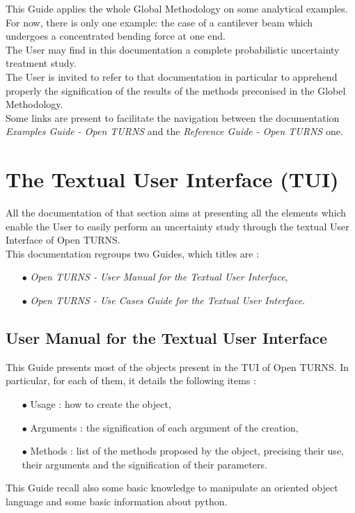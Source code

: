 \documentclass[11pt]{article}
\begin{document}
This Guide applies the whole Global Methodology on some analytical examples. For now, there is only one example: the case of a cantilever beam which undergoes a concentrated bending force at one end.\\

The User may find in this documentation a complete probabilistic uncertainty treatment study.\\

The User is invited to refer to that documentation in particular to apprehend properly the signification of the results of the methods preconised in the Globel Methodology.\\

Some links are present to facilitate the navigation between the documentation {\itshape Examples Guide - Open TURNS} and the {\itshape Reference Guide - Open TURNS} one.


\section{The Textual User Interface (TUI)}

All the documentation of that section aims at presenting all the elements which enable the User to easily perform an uncertainty study through the textual User Interface of Open TURNS. \\

This documentation regroups two Guides, which titles are :
\begin{itemize}
\item[$\bullet$] {\itshape Open TURNS - User Manual for the Textual User Interface},
\item[$\bullet$] {\itshape Open TURNS - Use Cases Guide for the Textual User Interface}.
\end{itemize}


\subsection{ User Manual for the Textual User Interface}

This Guide presents most of the objects present in the TUI of Open TURNS. In particular, for each of them, it details  the following items :
\begin{itemize}
\item[$\bullet$] Usage : how to create the object,
\item[$\bullet$] Arguments : the signification of each argument of the creation,
\item[$\bullet$] Methods : list of the methods proposed by the object, precising their use, their arguments and the signification of their parameters.
\end{itemize}
\vspace{0.5cm}
This Guide recall also some basic knowledge to manipulate an oriented object language and some basic information about python.\\
\end{document}
